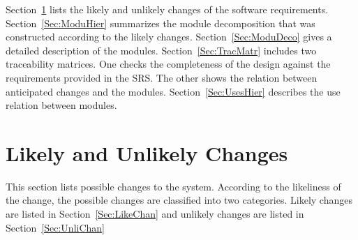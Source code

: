 \documentclass[12pt]{article}
\begin{document}
Section~\ref{Sec:LikeandUnliChan}  lists the likely and unlikely changes of the software requirements. Section~\ref{Sec:ModuHier}  summarizes the module decomposition that was constructed according to the likely changes. Section~\ref{Sec:ModuDeco}  gives a detailed description of the modules. Section~\ref{Sec:TracMatr}  includes two traceability matrices. One checks the completeness of the design against the requirements provided in the SRS. The other shows the relation between anticipated changes and the modules. Section~\ref{Sec:UsesHier}  describes the use relation between modules.
\section{Likely and Unlikely Changes}
\label{Sec:LikeandUnliChan}
This section lists possible changes to the system. According to the likeliness of the change, the possible changes are classified into two categories. Likely changes are listed in Section~\ref{Sec:LikeChan} and unlikely changes are listed in Section~\ref{Sec:UnliChan}
\end{document}
